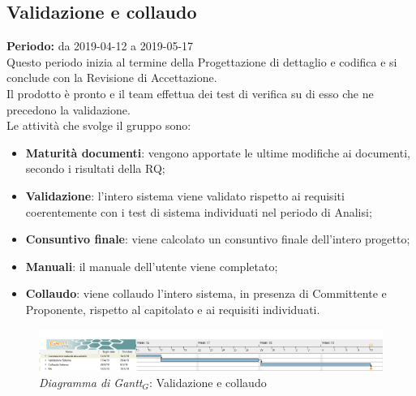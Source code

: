 \begin{flushleft}
\newpage
\section{Validazione e collaudo}
\textbf{Periodo:} da 2019-04-12 a 2019-05-17\\
Questo periodo inizia al termine della Progettazione di dettaglio e codifica e si conclude con la Revisione di Accettazione.\\
Il prodotto è pronto e il team effettua dei test di verifica su di esso che ne precedono la validazione.\\
Le attività che svolge il gruppo sono:
\begin{itemize}
   \item \textbf{Maturità documenti}: vengono apportate le ultime modifiche ai documenti, secondo i risultati della RQ;
   \item \textbf{Validazione}: l'intero sistema viene validato rispetto ai requisiti coerentemente con i test di sistema individuati nel periodo di Analisi;
   \item \textbf{Consuntivo finale}: viene calcolato un consuntivo finale dell'intero progetto;
   \item \textbf{Manuali}: il manuale dell'utente viene completato;
   \item \textbf{Collaudo}: viene collaudo l'intero sistema, in presenza di Committente e Proponente, rispetto al capitolato e ai requisiti individuati. 
\end{itemize}
\begin{figure} [h]
    \centering
    \includegraphics[scale=0.29]{./images/ZeroSevenGanttVerifica.png}
    \caption{\textit{Diagramma di Gantt$_{G}$}: Validazione e collaudo }\label{G5}
\end{figure}
\end{flushleft}